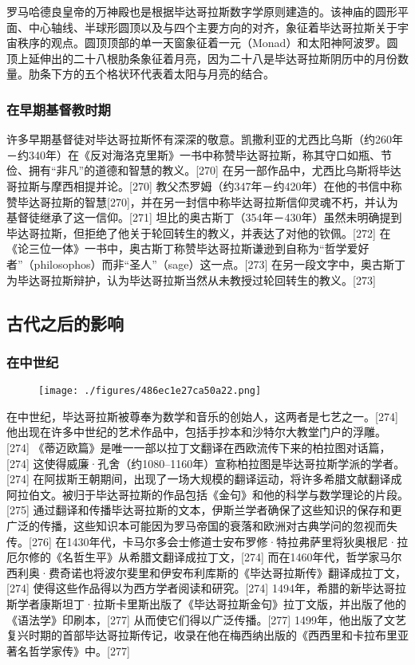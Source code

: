 罗马哈德良皇帝的万神殿也是根据毕达哥拉斯数字学原则建造的。该神庙的圆形平面、中心轴线、半球形圆顶以及与四个主要方向的对齐，象征着毕达哥拉斯关于宇宙秩序的观点。圆顶顶部的单一天窗象征着一元（Monad）和太阳神阿波罗。圆顶上延伸出的二十八根肋条象征着月亮，因为二十八是毕达哥拉斯阴历中的月份数量。肋条下方的五个格状环代表着太阳与月亮的结合。
\subsubsection{在早期基督教时期}
许多早期基督徒对毕达哥拉斯怀有深深的敬意。凯撒利亚的尤西比乌斯（约260年－约340年）在《反对海洛克里斯》一书中称赞毕达哥拉斯，称其守口如瓶、节俭、拥有“非凡”的道德和智慧的教义。[270] 在另一部作品中，尤西比乌斯将毕达哥拉斯与摩西相提并论。[270] 教父杰罗姆（约347年－约420年）在他的书信中称赞毕达哥拉斯的智慧[270]，并在另一封信中称毕达哥拉斯信仰灵魂不朽，并认为基督徒继承了这一信仰。[271] 坦比的奥古斯丁（354年－430年）虽然未明确提到毕达哥拉斯，但拒绝了他关于轮回转生的教义，并表达了对他的钦佩。[272] 在《论三位一体》一书中，奥古斯丁称赞毕达哥拉斯谦逊到自称为“哲学爱好者”（philosophos）而非“圣人”（sage）这一点。[273] 在另一段文字中，奥古斯丁为毕达哥拉斯辩护，认为毕达哥拉斯当然从未教授过轮回转生的教义。[273]
\subsection{古代之后的影响}  
\subsubsection{在中世纪}
\begin{figure}[ht]
\centering
\texttt{[image: ./figures/486ec1e27ca50a22.png]}
\caption{} \label{fig_Pythag_16}
\end{figure}
在中世纪，毕达哥拉斯被尊奉为数学和音乐的创始人，这两者是七艺之一。[274] 他出现在许多中世纪的艺术作品中，包括手抄本和沙特尔大教堂门户的浮雕。[274] 《蒂迈欧篇》是唯一一部以拉丁文翻译在西欧流传下来的柏拉图对话篇，[274] 这使得威廉·孔舍（约1080–1160年）宣称柏拉图是毕达哥拉斯学派的学者。[274] 在阿拔斯王朝期间，出现了一场大规模的翻译运动，将许多希腊文献翻译成阿拉伯文。被归于毕达哥拉斯的作品包括《金句》和他的科学与数学理论的片段。[275] 通过翻译和传播毕达哥拉斯的文本，伊斯兰学者确保了这些知识的保存和更广泛的传播，这些知识本可能因为罗马帝国的衰落和欧洲对古典学问的忽视而失传。[276] 在1430年代，卡马尔多会士修道士安布罗修·特拉弗萨里将狄奥根尼·拉厄尔修的《名哲生平》从希腊文翻译成拉丁文，[274] 而在1460年代，哲学家马尔西利奥·费奇诺也将波尔斐里和伊安布利库斯的《毕达哥拉斯传》翻译成拉丁文，[274] 使得这些作品得以为西方学者阅读和研究。[274] 1494年，希腊的新毕达哥拉斯学者康斯坦丁·拉斯卡里斯出版了《毕达哥拉斯金句》拉丁文版，并出版了他的《语法学》印刷本，[277] 从而使它们得以广泛传播。[277] 1499年，他出版了文艺复兴时期的首部毕达哥拉斯传记，收录在他在梅西纳出版的《西西里和卡拉布里亚著名哲学家传》中。[277]
